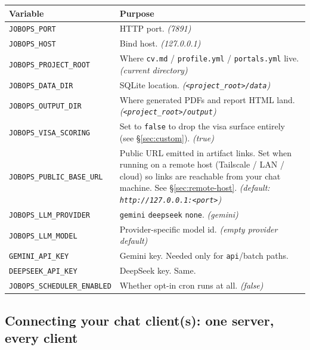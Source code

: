\documentclass[11pt,letterpaper]{article}
\newcommand{\fpath}[1]{\texttt{#1}}
\newcommand{\env}[1]{\texttt{#1}}
\begin{document}
\begin{center}
\small
\begin{tabularx}{\linewidth}{l X}
\toprule
\rowcolor{accent!10}\textbf{Variable} & \textbf{Purpose} \\
\midrule
\env{JOBOPS\_PORT}              & HTTP port. \textit{(7891)} \\
\env{JOBOPS\_HOST}              & Bind host. \textit{(127.0.0.1)} \\
\env{JOBOPS\_PROJECT\_ROOT}     & Where \fpath{cv.md} / \fpath{profile.yml} / \fpath{portals.yml} live. \textit{(current directory)} \\
\env{JOBOPS\_DATA\_DIR}         & SQLite location. \textit{(\texttt{<project\_root>/data})} \\
\env{JOBOPS\_OUTPUT\_DIR}       & Where generated PDFs and report HTML land. \textit{(\texttt{<project\_root>/output})} \\
\env{JOBOPS\_VISA\_SCORING}     & Set to \texttt{false} to drop the visa surface entirely (see \S\ref{sec:custom}). \textit{(true)} \\
\env{JOBOPS\_PUBLIC\_BASE\_URL} & Public URL emitted in artifact links. Set when running on a remote host (Tailscale / LAN / cloud) so links are reachable from your chat machine. See \S\ref{sec:remote-host}. \textit{(default: \texttt{http://127.0.0.1:<port>})} \\
\env{JOBOPS\_LLM\_PROVIDER}     & \texttt{gemini} \textbar{} \texttt{deepseek} \textbar{} \texttt{none}. \textit{(gemini)} \\
\env{JOBOPS\_LLM\_MODEL}        & Provider-specific model id. \textit{(empty \textrightarrow{} provider default)} \\
\env{GEMINI\_API\_KEY}            & Gemini key. Needed only for \texttt{api}/batch paths. \\
\env{DEEPSEEK\_API\_KEY}          & DeepSeek key. Same. \\
\env{JOBOPS\_SCHEDULER\_ENABLED} & Whether opt-in cron runs at all. \textit{(false)} \\
\bottomrule
\end{tabularx}
\end{center}

\subsection*{Connecting your chat client(s): one server, every client}
\end{document}

